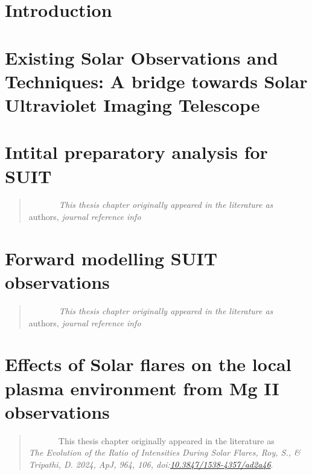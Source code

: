 \documentclass[plain]{hvdthesis}
\begin{document}
\chapter[Introduction]{Introduction}\label{c:intro}

\clearpage
%
\chapter{Existing Solar Observations and Techniques: A bridge towards Solar Ultraviolet Imaging Telescope}\label{c:chap2}

\clearpage
%
\chapter{Intital preparatory analysis for SUIT}\label{c:chap3}
\begin{quote}
{\em ~~~~~~~This thesis chapter originally appeared in the literature as} \\
{authors,
{\em journal reference info}}
\end{quote}

\clearpage
%
\chapter{Forward modelling SUIT observations}\label{c:chap4}
\begin{quote}
{\em ~~~~~~~This thesis chapter originally appeared in the literature as} \\
{authors,
{\em journal reference info}}
\end{quote}

%
%
%
\chapter{Effects of Solar flares on the local plasma environment from Mg II observations}\label{c:chap5}
\begin{quote}
{ ~~~~~~~This thesis chapter originally appeared in the literature as} \\
{{\em The Evolution of the Ratio of  Intensities During Solar Flares, Roy, S., \& Tripathi, D. 2024, ApJ, 964, 106, doi:\href{https://iopscience.iop.org/article/10.3847/1538-4357/ad2a46}{10.3847/1538-4357/ad2a46}}.}
\end{quote}

\clearpage
%
\end{document}

